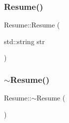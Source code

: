 \hypertarget{class_resume_a0da0b86ce16756cdfe0cc34afa77e975}{}\label{class_resume_a0da0b86ce16756cdfe0cc34afa77e975} 
\subsubsection{\texorpdfstring{Resume()}{Resume()}\hspace{0.1cm}{\footnotesize\ttfamily [4/4]}}
{\footnotesize\ttfamily Resume\+::\+Resume (\begin{DoxyParamCaption}\item[{std\+::string}]{str }\end{DoxyParamCaption})}

\hypertarget{class_resume_a86b302420dc26041de719f14ce6e6621}{}\label{class_resume_a86b302420dc26041de719f14ce6e6621} 
\subsubsection{\texorpdfstring{$\sim$\+Resume()}{~Resume()}}
{\footnotesize\ttfamily Resume\+::$\sim$\+Resume (\begin{DoxyParamCaption}{ }\end{DoxyParamCaption})\hspace{0.3cm}{\ttfamily [inline]}}

